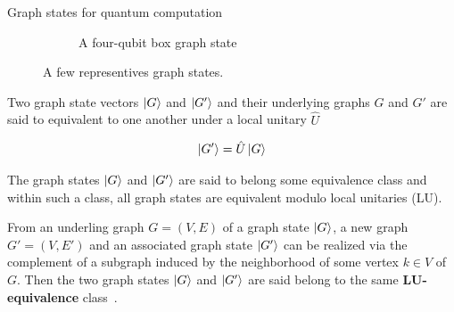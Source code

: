 \documentclass[final]{beamer}
\newlength{\colwidth}
\begin{document}
\begin{frame}[t]
\begin{columns}[t]
\begin{column}{\colwidth}
\begin{block}{Graph states for quantum computation}
\begin{figure}[H]
\begin{subfigure}[b]{0.40\textwidth}
                            \label{fig:linear_cluster_4q}
                        \end{subfigure}
                        \begin{subfigure}[b]{0.40\textwidth}
                            \centering
                            \caption{A four-qubit box graph state}
                            \label{fig:box_cluster_4q}
                        \end{subfigure}
                        \caption{A few representives graph states. }
                        \label{fig:graph_states}
                    \end{figure}

                    Two graph state vectors $\ket{G}$ and $\ket{G'}$  and their
                    underlying graphs $G$ and  $G'$ are said to
                    equivalent to one another under a local unitary $\hat{U}$ 

                    \begin{align}
                        \ket{G'} = \hat{U}\ket{G}
                        \label{eq:graph_state_unitary_equivalence}
                    \end{align}

                    The graph states $\ket{G}$ and $\ket{G'}$ are said to belong some
                    equivalence class and within such a class, all graph states are
                    equivalent modulo local unitaries (LU). 

                    From an underling graph $G = (V, E)$ of a graph state $\ket{G}$, a new
                    graph $G' = (V, E')$ and an associated graph state $\ket{G'}$ can be
                    realized via the complement of a subgraph induced by the neighborhood of some vertex $k
                    \in V$ of $G$. Then the two graph states $\ket{G}$ and $\ket{G'}$ are said belong to the same
                    \textbf{LU-equivalence} class~\cite{PhysRevA.69.062311}.
                \end{block}
            \end{column}


\end{columns}
\end{frame}
\end{document}
